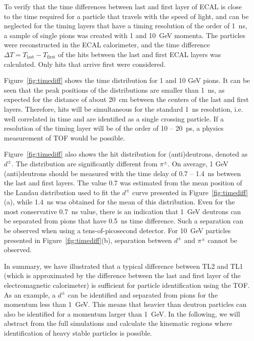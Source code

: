 \documentclass[final,1p,11pt]{elsarticle}
\begin{document}
To verify that the time differences between last and first layer of ECAL is close to the time
required for a particle that travels with the speed of light, and can be neglected for the timing layers that
have a timing resolution of the order of 1~ns, a sample of single pions was created with 1 and 10~GeV momenta. 
The particles were reconstructed in the ECAL calorimeter,
and the time difference $\Delta T= T_{\mathrm{last}}-T_{\mathrm{first}}$ of the hits between the last and first ECAL layers was calculated.
Only hits that arrive first were considered.

Figure~\ref{fig:timediff} shows the time distribution for 1 and 10 GeV pions. It can be seen that the peak positions of the distributions are smaller
than 1~ns, as expected for the distance of about 20~cm between  the centers of the last and first layers.
Therefore, hits will be simultaneous for the
standard 1~ns resolution, i.e. well correlated in time and are identified as a single crossing particle.
If a resolution of the timing layer will be of the order of 10 -- 20~ps, a physics measurement of TOF would be possible.

Figure~\ref{fig:timediff} also shows the hit distribution for (anti)deutrons, denoted as $d^{\pm}$. The distribution are significantly different from $\pi^{\pm}$. On average, 1 GeV
(anti)deutrons should be measured with the time delay of 0.7 -- 1.4~ns between the last and first layers.
The value 0.7 was estimated from the mean position of the Landau distribution used to fit the $d^{\pm}$ curve presented in Figure~\ref{fig:timediff}(a),
while 1.4~ns was obtained for the mean of this distribution. Even for the most conservative 0.7~ns value, there is an indication that 1~GeV
deutrons can be separated from pions that have 0.5~ns time difference. Such a separation can be observed when using a tens-of-picosecond detector.
For 10~GeV particles presented in Figure~\ref{fig:timediff}(b), separation between $d^{\pm}$ and $\pi^{\pm}$ cannot be observed.

In summary, we have illustrated that a typical difference between TL2 and TL1 (which is approximated by the difference
between the last and first layer of the electromagnetic calorimeter) is sufficient for particle identification using the TOF.
As an example, a $d^{\pm}$ can be identified and separated from pions for the momentum less than 1~GeV.
This means that  heavier than deutron particles can also be identified for a momentum larger than 1~GeV.
In the following, we will abstract from the full simulations and calculate the kinematic regions  where identification of heavy stable 
particles is possible.
 
\end{document}
